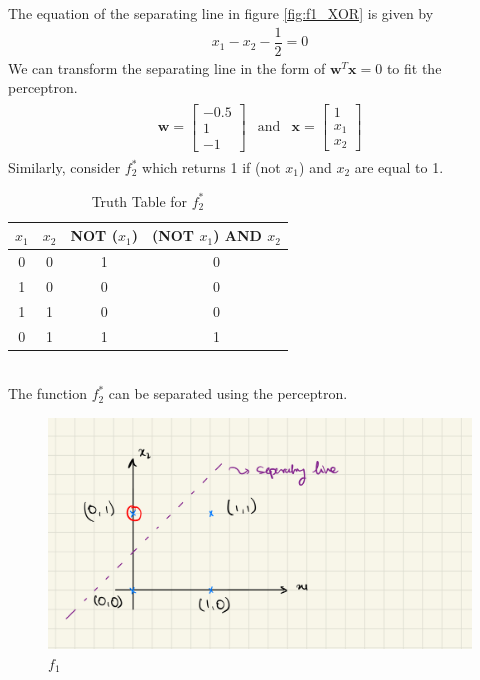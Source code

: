 The equation of the separating line in figure \ref{fig:f1_XOR} is given by
\begin{align}
  x_1 - x_2 - \dfrac{1}{2} = 0
\end{align}
We can transform the separating line in the form of $\textbf{w}^T\textbf{x} = 0$ to fit the perceptron.
\begin{align}
  \label{eq: weight_f_1}
  \begin{matrix}
    \textbf{w} = \begin{bmatrix}
      -0.5 \\
      1 \\
      -1
    \end{bmatrix} & \text{and} & \textbf{x} = \begin{bmatrix}
      1 \\
      x_1 \\
      x_2
    \end{bmatrix}
  \end{matrix}
\end{align}
Similarly, consider $f_2^{*}$ which returns 1 if (not $x_1$) and $x_2$ are equal to 1.
\begin{table}
  \begin{center}
    \begin{tabular}{ c c c c}
      $x_1$ & $x_2$ & NOT ($x_1$) & (NOT $x_1$) AND $x_2$ \\
     \hline 
      0 & 0 & 1 & 0 \\  
      1 & 0 & 0 & 0 \\  
      1 & 1 & 0 & 0 \\  
      0 & 1 & 1 & 1 
    \end{tabular}
    \caption{Truth Table for $f_2^{*}$}
  \label{table:truth_table_f_2}
  \end{center}  
\end{table} \vspace{40mm}\\
The function $f_2^{*}$ can be separated using the perceptron.
\begin{figure}[ht]
  \centering
  \includegraphics[scale=0.15]{CHAPTER_2/c2_fig_f_2_XOR.jpeg}
  \caption{$f_1$}
  \label{fig:f2_XOR}
\end{figure} \\
